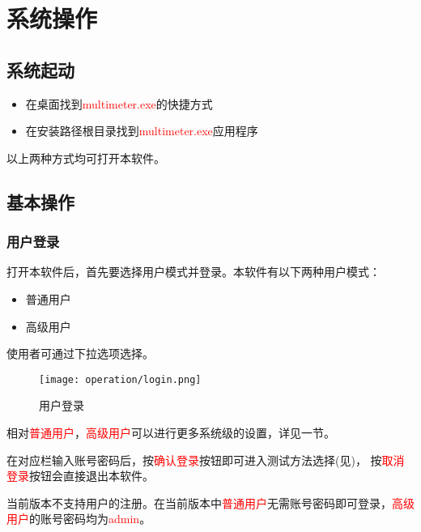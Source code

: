 \chapter{系统操作\label{ch:operation}}
\section{系统起动}
\begin{itemize}
    \item 在桌面找到\textcolor{red}{multimeter.exe}的快捷方式
    \item 在安装路径根目录找到\textcolor{red}{multimeter.exe}应用程序
\end{itemize}
以上两种方式均可打开本软件。
\section{基本操作}
\subsection{用户登录}
打开本软件后，首先要选择用户模式并登录。本软件有以下两种用户模式：
\begin{itemize}
    \item 普通用户
    \item 高级用户
\end{itemize}
使用者可通过下拉选项选择。
\begin{figure}[H]
    \centering
    \texttt{[image: operation/login.png]}
    \caption{ 用户登录 \label{fig:login}}
\end{figure}
相对\textcolor{red}{普通用户}，\textcolor{red}{高级用户}可以进行更多系统级的设置，详见一节。

在对应栏输入账号密码后，按\textcolor{red}{确认登录}按钮即可进入测试方法选择(见)，
按\textcolor{red}{取消登录}按钮会直接退出本软件。
\begin{note}
    当前版本不支持用户的注册。在当前版本中\textcolor{red}{普通用户}无需账号密码即可登录，\textcolor{red}{高级用户}的账号密码均为\textcolor{red}{admin}。
\end{note}
